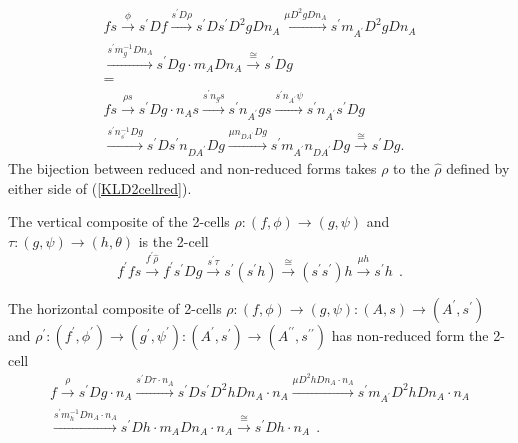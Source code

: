 \documentclass[a4paper,10pt]{article}
\numberwithin{equation}{section}
\begin{document}
\begin{multline}\label{KLD2cellred}
f s\overset{\phi } {\longrightarrow} s^{\prime }Df \overset{s^{\prime
}D\rho } {\longrightarrow} s^{\prime} Ds^{\prime } D^{2} g Dn_A \overset{\mu
D^{2} g Dn_A}{\longrightarrow} s^{\prime} m_{A^{\prime}} D^{2} g Dn_A \\ 
\overset{s^{\prime} m_{g}^{-1} Dn_A}{\longrightarrow}s^{\prime} Dg  \cdot m_A Dn_A \overset{\cong}{\longrightarrow} s^{\prime} Dg  \\
= \\
f s\overset{\rho s}{\longrightarrow } s^{\prime }
Dg \cdot n_A s \overset{s^{\prime} n_g s}{\longrightarrow}s^{\prime} n_{A^{\prime}} g s 
\overset{s^{\prime} n_{A^{\prime}} \psi }{\longrightarrow} s^{\prime} n_{A^{\prime}} s^{\prime} Dg \\
\overset{s^{\prime} n_{s^{\prime}}^{-1} Dg}{\longrightarrow} 
s^{\prime} Ds^{\prime} n_{DA^{\prime}} Dg \overset{\mu n_{DA^{\prime}} Dg}{\longrightarrow
}s^{\prime} m_{A^{\prime}} n_{DA^{\prime}} Dg \overset{\cong}{\longrightarrow
}s^{\prime} Dg  .
\end{multline}
The bijection between reduced and non-reduced forms takes $\rho$ to the $\hat{\rho}$ defined by either side of (\ref{KLD2cellred}).  

The vertical composite of the 2-cells $\rho:(f,\phi) \longrightarrow (g,\psi)$ and $\tau:(g,\psi)\longrightarrow (h,\theta)$ is the 2-cell
\begin{equation}
f^{\prime} fs\overset{f^{\prime} \hat{\rho}}{\longrightarrow }f^{\prime} s^{\prime } Dg \overset{s^{\prime
}\tau }{\longrightarrow }s^{\prime }( s^{\prime }h) \overset{\cong
}{\longrightarrow }\left( s^{\prime }s^{\prime }\right) h\overset{\mu
h}{\longrightarrow }s^{\prime }h\ \ .
\end{equation}

The horizontal composite of 2-cells $\rho : (f, \phi)\longrightarrow (g, \psi) : (A,s) \longrightarrow (A^{\prime},s^{\prime})$ and $\rho^{\prime} : (f^{\prime}, \phi^{\prime})\longrightarrow (g^{\prime}, \psi^{\prime}) : (A^{\prime},s^{\prime}) \longrightarrow (A^{\prime \prime},s^{\prime \prime})$ has non-reduced form the 2-cell 
\begin{multline}
f \overset{\rho}{\longrightarrow} s^{\prime} Dg \cdot n_A \overset{s^{\prime} D\tau \cdot n_A}{\longrightarrow } s^{\prime} Ds^{\prime} D^{2}hDn_A \cdot n_A \overset{\mu D^{2}hDn_A \cdot n_A}{\longrightarrow } s^{\prime} m_{A^{\prime}} D^{2}hDn_A \cdot n_A \\
\overset{s^{\prime} m_{h}^{-1}Dn_A \cdot n_A}{\longrightarrow } s^{\prime} Dh \cdot m_{A} Dn_A \cdot n_A\overset{\cong}{\longrightarrow} s^{\prime} Dh \cdot n_A\ \ .
\end{multline}
\end{document}
